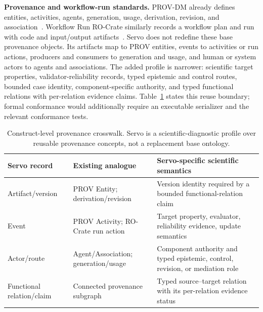 \documentclass{article}
\begin{document}
\textbf{Provenance and workflow-run standards.} PROV-DM already defines entities, activities, agents, generation, usage, derivation, revision, and association~\citep{w3cprov2013}. Workflow Run RO-Crate similarly records a workflow plan and run with code and input/output artifacts~\citep{workflowruncrate2023}. Servo does not redefine these base provenance objects. Its artifacts map to PROV entities, events to activities or run actions, producers and consumers to generation and usage, and human or system actors to agents and associations. The added profile is narrower: scientific target properties, validator-reliability records, typed epistemic and control routes, bounded case identity, component-specific authority, and typed functional relations with per-relation evidence claims. Table~\ref{tab:provenance-crosswalk} states this reuse boundary; formal conformance would additionally require an executable serializer and the relevant conformance tests.

{\setlength{\intextsep}{18pt plus 4pt minus 4pt}
\begin{table}[h]
\centering
\scriptsize
\setlength{\tabcolsep}{3pt}
\begin{tabular}{p{.18\linewidth}p{.25\linewidth}p{.48\linewidth}}
\toprule
Servo record & Existing analogue & Servo-specific scientific semantics \\
\midrule
Artifact/version & PROV Entity; derivation/revision & Version identity required by a bounded functional-relation claim \\
Event & PROV Activity; RO-Crate run action & Target property, evaluator, reliability evidence, update semantics \\
Actor/route & Agent/Association; generation/usage & Component authority and typed epistemic, control, revision, or mediation role \\
Functional relation/claim & Connected provenance subgraph & Typed source--target relation with its per-relation evidence status \\
\bottomrule
\end{tabular}
\caption{Construct-level provenance crosswalk. Servo is a scientific-diagnostic profile over reusable provenance concepts, not a replacement base ontology.}
\label{tab:provenance-crosswalk}
\end{table}}

{\setlength{\intextsep}{18pt plus 4pt minus 4pt}
\begin{table}[h]
\centering
\scriptsize
\setlength{\tabcolsep}{3pt}
\resizebox{\textwidth}{!}{}
\caption{Direct construct-level comparison with AI Scientist survey frameworks, using each framework's native unit. This is not a performance ranking. Servo's claimed increment is selected system-level channel and interface resolution, not the first unified framework or information that the alternatives are incapable of representing.}
\label{tab:framework-crosswalk}
\end{table}}
\end{document}
